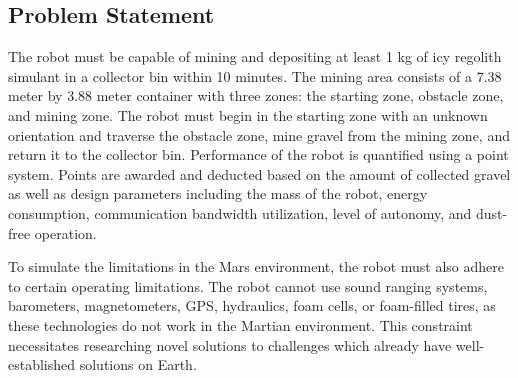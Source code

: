 \documentclass[class=article, crop=false]{standalone}
\begin{document}
	\subsection{Problem Statement}
	\label{subsec:problem_statement}
	The robot must be capable of mining and depositing at least 1 kg of icy regolith simulant in a collector bin within 10 minutes. The mining area consists of a 7.38 meter by 3.88 meter container with three zones: the starting zone, obstacle zone, and mining zone. The robot must begin in the starting zone with an unknown orientation and traverse the obstacle zone, mine gravel from the mining zone, and return it to the collector bin. Performance of the robot is quantified using a point system. Points are awarded and deducted based on the amount of collected gravel as well as design parameters including  the mass of the robot, energy consumption, communication bandwidth utilization, level of autonomy, and dust-free operation.
	
	
	To simulate the limitations in the Mars environment, the robot must also adhere to certain operating limitations. The robot cannot use sound ranging systems, barometers, magnetometers, GPS, hydraulics, foam cells, or foam-filled tires, as these technologies do not work in the Martian environment. This constraint necessitates researching novel solutions to challenges which already have well-established solutions on Earth.



	
\end{document}
